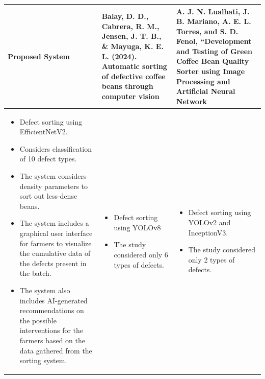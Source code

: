 \begin{center}
	\small

    \begin{longtable}{| p{5cm} | p{4cm} | p{4cm} |}
    \hline
    Proposed System & Balay, D. D., Cabrera, R. M., Jensen, J. T. B., \& Mayuga, K. E. L. (2024). Automatic sorting of defective coffee beans through computer vision & A. J. N. Lualhati, J. B. Mariano, A. E. L. Torres, and S. D. Fenol, “Development and Testing of Green Coffee Bean Quality Sorter using Image Processing and Artificial Neural Network  \\ \hline
    
	\begin{itemize}
		\item Defect sorting using EfficientNetV2. 

		\item Considers classification of 10 defect types. 
	
		\item The system considers density parameters to sort out less-dense beans. 
	
		\item The system includes a graphical user interface for farmers to visualize the cumulative data of the defects present in the batch. 
	
		\item The system also includes AI-generated recommendations on the possible interventions for the farmers based on the data gathered from the sorting system.  
	\end{itemize}
	&
	\begin{itemize}
		\item Defect sorting using YOLOv8 

		\item The study considered only 6 types of defects. 
	\end{itemize}
	&
	\begin{itemize}
		\item Defect sorting using YOLOv2 and InceptionV3. 

		\item The study considered only 2 types of defects. 
	\end{itemize}
	\\
	\hline
    \end{longtable}
\end{center}


